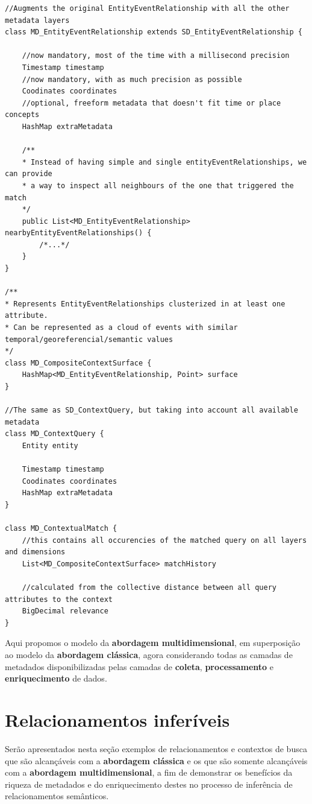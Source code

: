 \begin{verbatim}
//Augments the original EntityEventRelationship with all the other metadata layers
class MD_EntityEventRelationship extends SD_EntityEventRelationship {
    
    //now mandatory, most of the time with a millisecond precision
    Timestamp timestamp
    //now mandatory, with as much precision as possible
    Coodinates coordinates
    //optional, freeform metadata that doesn't fit time or place concepts
    HashMap extraMetadata

    /**
    * Instead of having simple and single entityEventRelationships, we can provide
    * a way to inspect all neighbours of the one that triggered the match
    */
    public List<MD_EntityEventRelationship> nearbyEntityEventRelationships() {
        /*...*/
    }
}

/**
* Represents EntityEventRelationships clusterized in at least one attribute.
* Can be represented as a cloud of events with similar temporal/georeferencial/semantic values
*/
class MD_CompositeContextSurface {
    HashMap<MD_EntityEventRelationship, Point> surface
}

//The same as SD_ContextQuery, but taking into account all available metadata
class MD_ContextQuery {
    Entity entity

    Timestamp timestamp
    Coodinates coordinates
    HashMap extraMetadata
}

class MD_ContextualMatch {
    //this contains all occurencies of the matched query on all layers and dimensions
    List<MD_CompositeContextSurface> matchHistory

    //calculated from the collective distance between all query attributes to the context
    BigDecimal relevance
}
\end{verbatim}

Aqui propomos o modelo da \textbf{abordagem multidimensional}, em superposição ao modelo da \textbf{abordagem clássica}, agora considerando todas as camadas de metadados disponibilizadas pelas camadas de \textbf{coleta}, \textbf{processamento} e \textbf{enriquecimento} de dados.

\section{Relacionamentos inferíveis}

Serão apresentados nesta seção exemplos de relacionamentos e contextos de busca que são alcançáveis com a \textbf{abordagem clássica} e os que são somente alcançáveis com a \textbf{abordagem multidimensional}, a fim de demonstrar os benefícios da riqueza de metadados e do enriquecimento destes no processo de inferência de relacionamentos semânticos.

